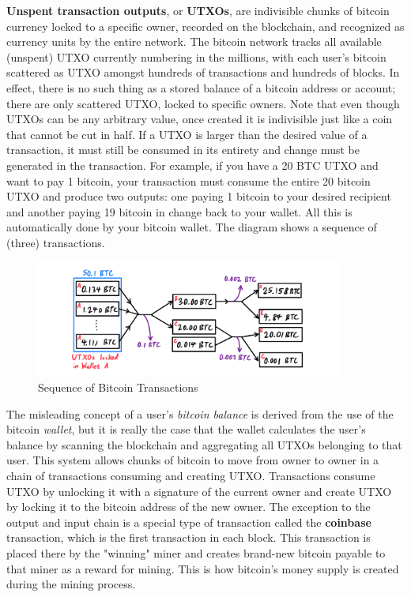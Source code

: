 \documentclass{article}
\begin{document}
    \textbf{Unspent transaction outputs}, or \textbf{UTXOs}, are indivisible chunks of bitcoin currency locked to a specific owner, recorded on the blockchain, and recognized as currency units by the entire network. The bitcoin network tracks all available (unspent) UTXO currently numbering in the millions, with each user's bitcoin scattered as UTXO amongst hundreds of transactions and hundreds of blocks. In effect, there is no such thing as a stored balance of a bitcoin address or account; there are only scattered UTXO, locked to specific owners. Note that even though UTXOs can be any arbitrary value, once created it is indivisible just like a coin that cannot be cut in half. If a UTXO is larger than the desired value of a transaction, it must still be consumed in its entirety and change must be generated in the transaction. For example, if you have a 20 BTC UTXO and want to pay 1 bitcoin, your transaction must consume the entire 20 bitcoin UTXO and produce two outputs: one paying 1 bitcoin to your desired recipient and another paying 19 bitcoin in change back to your wallet. All this is automatically done by your bitcoin wallet. The diagram shows a sequence of (three) transactions.

    \begin{figure}[H]
    \centering
    \includegraphics[width=0.9\textwidth]{img/Bitcoin_transaction.png}
    \caption{Sequence of Bitcoin Transactions}
    \end{figure}

    The misleading concept of a user's \textit{bitcoin balance} is derived from the use of the bitcoin \textit{wallet}, but it is really the case that the wallet calculates the user's balance by scanning the blockchain and aggregating all UTXOs belonging to that user. This system allows chunks of bitcoin to move from owner to owner in a chain of transactions consuming and creating UTXO. Transactions consume UTXO by unlocking it with a signature of the current owner and create UTXO by locking it to the bitcoin address of the new owner. The exception to the output and input chain is a special type of transaction called the \textbf{coinbase} transaction, which is the first transaction in each block. This transaction is placed there by the "winning" miner and creates brand-new bitcoin payable to that miner as a reward for mining. This is how bitcoin's money supply is created during the mining process.
\end{document}
